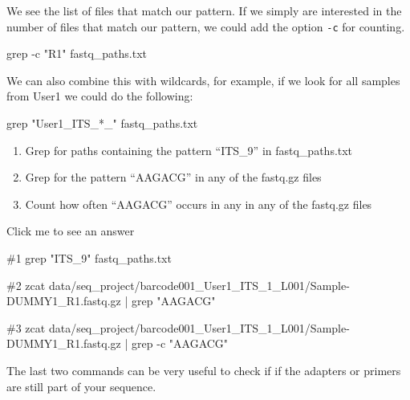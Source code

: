 \documentclass[
  letterpaper,
  DIV=11,
  numbers=noendperiod]{scrreprt}
\newenvironment{Shaded}{}{}
\newcommand{\AttributeTok}[1]{\textcolor[rgb]{0.84,0.23,0.29}{#1}}
\newcommand{\CommentTok}[1]{\textcolor[rgb]{0.42,0.45,0.49}{#1}}
\newcommand{\FunctionTok}[1]{\textcolor[rgb]{0.44,0.26,0.76}{#1}}
\newcommand{\KeywordTok}[1]{\textcolor[rgb]{0.84,0.23,0.29}{#1}}
\newcommand{\NormalTok}[1]{\textcolor[rgb]{0.14,0.16,0.18}{#1}}
\newcommand{\StringTok}[1]{\textcolor[rgb]{0.01,0.18,0.38}{#1}}
\providecommand{\tightlist}{%
  \setlength{\itemsep}{0pt}\setlength{\parskip}{0pt}}\usepackage{longtable,booktabs,array}
\begin{document}
We see the list of files that match our pattern. If we simply are
interested in the number of files that match our pattern, we could add
the option \texttt{-c} for counting.

\begin{Shaded}
\begin{Highlighting}[]
\FunctionTok{grep} \AttributeTok{{-}c} \StringTok{"R1"}\NormalTok{ fastq\_paths.txt}
\end{Highlighting}
\end{Shaded}

We can also combine this with wildcards, for example, if we look for all
samples from User1 we could do the following:

\begin{Shaded}
\begin{Highlighting}[]
\FunctionTok{grep} \StringTok{"User1\_ITS\_*\_"}\NormalTok{ fastq\_paths.txt}
\end{Highlighting}
\end{Shaded}

\begin{tcolorbox}[enhanced jigsaw, rightrule=.15mm, colbacktitle=quarto-callout-caution-color!10!white, colframe=quarto-callout-caution-color-frame, colback=white, arc=.35mm, opacitybacktitle=0.6, coltitle=black, bottomtitle=1mm, breakable, bottomrule=.15mm, leftrule=.75mm, titlerule=0mm, title=\textcolor{quarto-callout-caution-color}{\faFire}\hspace{0.5em}{Exercise}, toprule=.15mm, toptitle=1mm, opacityback=0, left=2mm]

\begin{enumerate}
\def\labelenumi{\arabic{enumi}.}
\tightlist
\item
  Grep for paths containing the pattern ``ITS\_9'' in fastq\_paths.txt
\item
  Grep for the pattern ``AAGACG'' in any of the fastq.gz files
\item
  Count how often ``AAGACG'' occurs in any in any of the fastq.gz files
\end{enumerate}

Click me to see an answer

\begin{Shaded}
\begin{Highlighting}[]
\CommentTok{\#1}
\FunctionTok{grep} \StringTok{"ITS\_9"}\NormalTok{ fastq\_paths.txt}

\CommentTok{\#2}
\FunctionTok{zcat}\NormalTok{ data/seq\_project/barcode001\_User1\_ITS\_1\_L001/Sample{-}DUMMY1\_R1.fastq.gz }\KeywordTok{|} \FunctionTok{grep} \StringTok{"AAGACG"}

\CommentTok{\#3}
\FunctionTok{zcat}\NormalTok{ data/seq\_project/barcode001\_User1\_ITS\_1\_L001/Sample{-}DUMMY1\_R1.fastq.gz }\KeywordTok{|} \FunctionTok{grep} \AttributeTok{{-}c} \StringTok{"AAGACG"}
\end{Highlighting}
\end{Shaded}

The last two commands can be very useful to check if if the adapters or
primers are still part of your sequence.

\end{tcolorbox}
\end{document}
